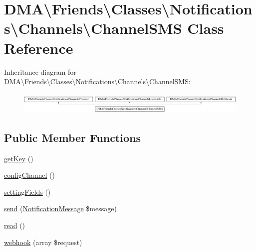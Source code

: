 \hypertarget{classDMA_1_1Friends_1_1Classes_1_1Notifications_1_1Channels_1_1ChannelSMS}{\section{D\+M\+A\textbackslash{}Friends\textbackslash{}Classes\textbackslash{}Notifications\textbackslash{}Channels\textbackslash{}Channel\+S\+M\+S Class Reference}
\label{classDMA_1_1Friends_1_1Classes_1_1Notifications_1_1Channels_1_1ChannelSMS}
}
Inheritance diagram for D\+M\+A\textbackslash{}Friends\textbackslash{}Classes\textbackslash{}Notifications\textbackslash{}Channels\textbackslash{}Channel\+S\+M\+S\+:\begin{figure}[H]
\begin{center}
\leavevmode
\includegraphics[height=1.060606cm]{d2/d14/classDMA_1_1Friends_1_1Classes_1_1Notifications_1_1Channels_1_1ChannelSMS}
\end{center}
\end{figure}
\subsection*{Public Member Functions}
\begin{DoxyCompactItemize}
\item 
\hyperlink{classDMA_1_1Friends_1_1Classes_1_1Notifications_1_1Channels_1_1ChannelSMS_af645c26a2c6baf2e5106a464d7d74d7e}{get\+Key} ()
\item 
\hyperlink{classDMA_1_1Friends_1_1Classes_1_1Notifications_1_1Channels_1_1ChannelSMS_a3b57af73b9e017991e9872232717b686}{config\+Channel} ()
\item 
\hyperlink{classDMA_1_1Friends_1_1Classes_1_1Notifications_1_1Channels_1_1ChannelSMS_aee4d07da05caa5a14b8c126d6ccf2083}{setting\+Fields} ()
\item 
\hyperlink{classDMA_1_1Friends_1_1Classes_1_1Notifications_1_1Channels_1_1ChannelSMS_a74d477bcee51e0a8d4c27e482e775eb8}{send} (\hyperlink{classDMA_1_1Friends_1_1Classes_1_1Notifications_1_1NotificationMessage}{Notification\+Message} \$message)
\item 
\hyperlink{classDMA_1_1Friends_1_1Classes_1_1Notifications_1_1Channels_1_1ChannelSMS_ad07cd397e4a5d268f56cf59c850f1583}{read} ()
\item 
\hyperlink{classDMA_1_1Friends_1_1Classes_1_1Notifications_1_1Channels_1_1ChannelSMS_a64e0d1bb196c93b02f3f208b50574c76}{webhook} (array \$request)
\end{DoxyCompactItemize}


